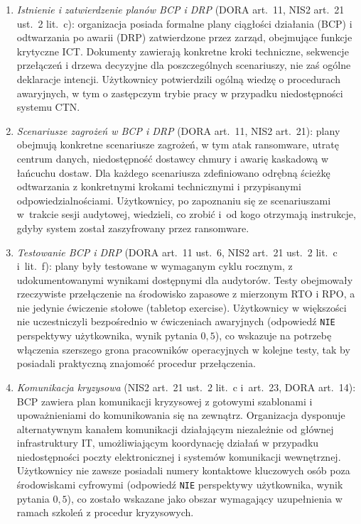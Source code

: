 \begin{enumerate}[label=(\roman*)]
\item \textit{Istnienie i zatwierdzenie planów BCP i DRP} (DORA art.~11, NIS2 art.~21 ust.~2 lit.~c): organizacja posiada formalne plany ciągłości działania (BCP) i odtwarzania po awarii (DRP) zatwierdzone przez zarząd, obejmujące funkcje krytyczne ICT. Dokumenty zawierają konkretne kroki techniczne, sekwencje przełączeń i drzewa decyzyjne dla poszczególnych scenariuszy, nie zaś ogólne deklaracje intencji. Użytkownicy potwierdzili ogólną wiedzę o procedurach awaryjnych, w tym o zastępczym trybie pracy w przypadku niedostępności systemu CTN.

\item \textit{Scenariusze zagrożeń w BCP i DRP} (DORA art.~11, NIS2 art.~21): plany obejmują konkretne scenariusze zagrożeń, w tym atak ransomware, utratę centrum danych, niedostępność dostawcy chmury i awarię kaskadową w łańcuchu dostaw. Dla każdego scenariusza zdefiniowano odrębną ścieżkę odtwarzania z konkretnymi krokami technicznymi i przypisanymi odpowiedzialnościami. Użytkownicy, po zapoznaniu się ze scenariuszami w~trakcie sesji audytowej, wiedzieli, co zrobić i~od kogo otrzymają instrukcje, gdyby system został zaszyfrowany przez ransomware.

\item \textit{Testowanie BCP i DRP} (DORA art.~11 ust.~6, NIS2 art.~21 ust.~2 lit.~c i~lit.~f): plany były testowane w wymaganym cyklu rocznym, z udokumentowanymi wynikami dostępnymi dla audytorów. Testy obejmowały rzeczywiste przełączenie na środowisko zapasowe z mierzonym RTO i RPO, a nie jedynie ćwiczenie stołowe (tabletop exercise). Użytkownicy w większości nie uczestniczyli bezpośrednio w ćwiczeniach awaryjnych (odpowiedź \texttt{NIE} perspektywy użytkownika, wynik pytania $0{,}5$), co wskazuje na potrzebę włączenia szerszego grona pracowników operacyjnych w kolejne testy, tak by posiadali praktyczną znajomość procedur przełączenia.

\item \textit{Komunikacja kryzysowa} (NIS2 art.~21 ust.~2 lit.~c i~art.~23, DORA art.~14): BCP zawiera plan komunikacji kryzysowej z gotowymi szablonami i upoważnieniami do komunikowania się na zewnątrz. Organizacja dysponuje alternatywnym kanałem komunikacji działającym niezależnie od głównej infrastruktury IT, umożliwiającym koordynację działań w przypadku niedostępności poczty elektronicznej i systemów komunikacji wewnętrznej. Użytkownicy nie zawsze posiadali numery kontaktowe kluczowych osób poza środowiskami cyfrowymi (odpowiedź \texttt{NIE} perspektywy użytkownika, wynik pytania $0{,}5$), co zostało wskazane jako obszar wymagający uzupełnienia w ramach szkoleń z procedur kryzysowych.


\end{enumerate}
